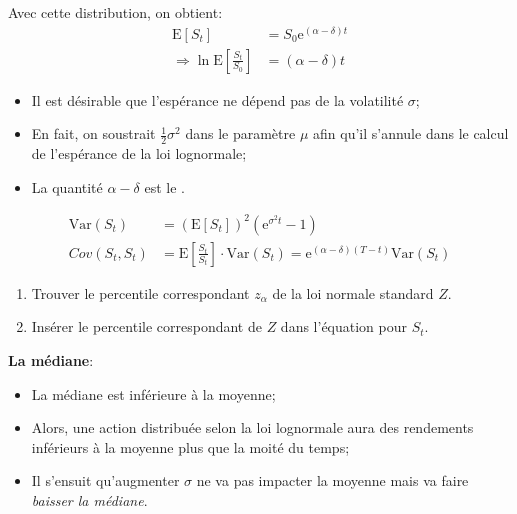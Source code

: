 \documentclass[10pt, french]{article}
\begin{document}
\begin{multicols*}{2}
\begin{definitionNOHFILLsub}
Avec cette distribution, on obtient:
\begin{align*}
	\text{E}[S_{t}]
	&=	S_{0}\textrm{e}^{(\alpha - \delta)t}		\\
	\Rightarrow
	\ln\text{E}\left[\frac{S_{t}}{S_{0}}\right]
	&=	(\alpha - \delta)t
\end{align*}
\begin{itemize}
	\item	Il est désirable que l'espérance ne dépend pas de la volatilité $\sigma$;
	\item	En fait, on soustrait $\frac{1}{2}\sigma^{2}$ dans le paramètre $\mu$ afin qu'il s'annule dans le calcul de l'espérance de la loi lognormale;
	\item	La quantité $\alpha	-	\delta$ est le .
\end{itemize}
\begin{align*}
	\text{Var}(S_{t})
	&=	\left(\text{E}[S_{t}]\right)^{2} \left(\textrm{e}^{\sigma^{2}t} - 1\right)	\\
	Cov(S_{t}, S_{t})
	&=	\text{E}\left[\frac{S_{t}}{S_{t}}\right] \cdot \text{Var}(S_{t})	
	=	\textrm{e}^{(\alpha - \delta)(T - t)} \text{Var}(S_{t})
\end{align*}
\end{definitionNOHFILLsub}

\begin{distributions}
\begin{enumerate}[leftmargin = *]
	\item	Trouver le percentile correspondant $z_{\alpha}$ de la loi normale standard $Z$.
	\item	Insérer le percentile correspondant de $Z$ dans l'équation pour $S_{t}$.
\end{enumerate}
\end{distributions}

\textbf{La médiane}:
\begin{itemize}
	\item	La médiane  est inférieure à la moyenne;
	\item	Alors, une action distribuée selon la loi lognormale aura des rendements inférieurs à la moyenne plus que la moité du temps;
	\item	Il s'ensuit qu'augmenter $\sigma$ ne va pas impacter la moyenne mais va faire \textit{baisser la médiane}.
\end{itemize}


\end{multicols*}
\end{document}
